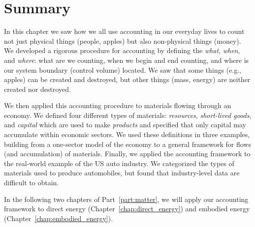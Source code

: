 \section{Summary}
\label{sec:materials_summary}

In this chapter we saw how we all use accounting in our everyday lives
to count not just physical things (people, apples) but also non-physical things
(money). We developed a rigorous procedure for accounting by defining the 
\emph{what}, \emph{when}, and \emph{where}: what are we counting,
when we begin and end counting,
and where is our system boundary (control volume) located. 
We saw that some things (e.g., apples) can be
created and destroyed, but other things (mass, energy)
are neither created nor destroyed.

We then applied this accounting procedure to materials 
flowing through an economy. 
We defined four different types of materials: \emph{resources},
\emph{short-lived goods}, and \emph{capital} which are used to make
\emph{products} and specified that only capital 
may accumulate within economic sectors.
We used these definitions in three examples,
building from a one-sector model of the economy
to a general framework for flows (and accumulation) 
of materials.
Finally, we applied the accounting framework to the 
real-world example of the US auto industry.
We categorized the types of materials used to produce
automobiles,
but found that industry-level data are difficult to obtain.

In the following two chapters of Part~\ref{part:matter},
we will apply our accounting framework 
to direct energy (Chapter~\ref{chap:direct_energy})
and embodied energy (Chapter~\ref{chap:embodied_energy}).







%
%

